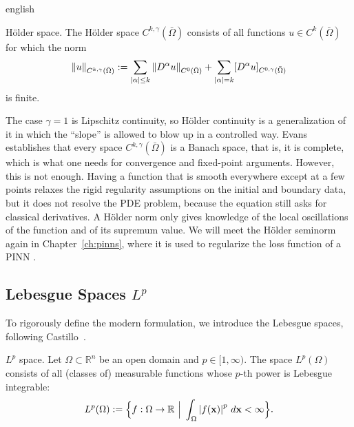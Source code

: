 \begin{hyphenrules}{english}
\begin{definicion}{Hölder space.}\label{def:holder-space}
The Hölder space $C^{k,\gamma}(\bar\Omega)$ consists of all functions $u\in C^k(\bar\Omega)$ for which
the norm
\begin{equation}
  \left\lVert u \right\rVert_{C^{k,\gamma}(\bar\Omega)}:=\sum_{\left\lvert \alpha \right\rvert\le k}\left\lVert D^\alpha u \right\rVert_{C^0(\bar\Omega)}
  +\sum_{\left\lvert \alpha \right\rvert=k}[D^\alpha u]_{C^{0,\gamma}(\bar\Omega)}
  \label{eq:holder-norm}
\end{equation}
is finite.
\end{definicion}

The case $\gamma=1$ is Lipschitz continuity, so Hölder continuity is a generalization of it in which the
``slope'' is allowed to blow up in a controlled way. Evans~\cite{evans2010} establishes that every space
$C^{k,\gamma}(\bar\Omega)$ is a Banach space, that is, it is complete, which is what one needs for
convergence and fixed-point arguments. However, this is not enough. Having a function that is smooth
everywhere except at a few points relaxes the rigid regularity assumptions on the initial and boundary
data, but it does not resolve the PDE problem, because the equation still asks for classical
derivatives. A Hölder norm only gives knowledge of the local oscillations of the function and of its
supremum value. We will meet the Hölder seminorm again in Chapter~\ref{ch:pinns}, where it is used to
regularize the loss function of a PINN \cite{shin2020convergence}.

\subsection{Lebesgue Spaces $L^p$}\label{subsec:lp}

To rigorously define the modern formulation, we introduce the Lebesgue spaces, following
Castillo~\cite{castillo2014}.

\begin{definicion}{$L^p$ space.}\label{def:lp}
Let $\Omega\subset\mathbb{R}^n$ be an open domain and $p\in[1,\infty)$. The space $L^p(\Omega)$ consists of all
(classes of) measurable functions whose $p$-th power is Lebesgue integrable:
\begin{equation}
  L^p(\Omega):=\Big\{f:\Omega\to\mathbb{R}\ \Big|\ \int_\Omega\abs{f(\mathbf{x})}^p\,d\mathbf{x}<\infty\Big\}.
  \label{eq:lp}
\end{equation}
\end{definicion}


\end{hyphenrules}

